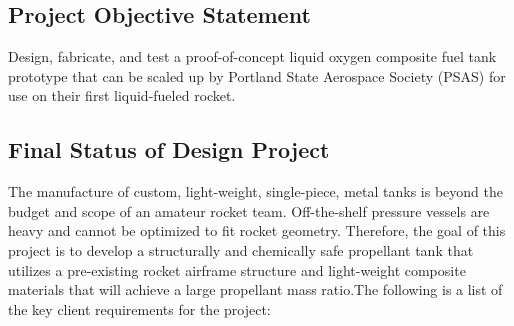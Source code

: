 
\subsection{Project Objective Statement}
Design, fabricate, and test a proof-of-concept liquid oxygen composite fuel tank prototype that can be scaled up by Portland State Aerospace Society (PSAS) for use on their first liquid-fueled  rocket. 



\subsection{Final Status of Design Project}

The manufacture of custom, light-weight, single-piece, metal tanks is beyond the budget and scope of an amateur rocket team. Off-the-shelf pressure vessels are heavy and cannot be optimized to fit rocket geometry. Therefore, the goal of this project is to develop a structurally and chemically safe propellant tank that utilizes a pre-existing rocket airframe structure \cite{LV3Airframe} and light-weight composite materials that will achieve a large propellant mass ratio.The following is a list of the key client requirements for the project:

\vspace{0.2cm}

